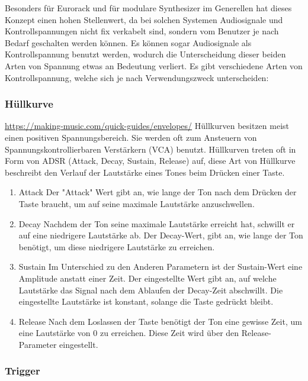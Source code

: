 Besonders für Eurorack und für modulare Synthesizer im Generellen hat dieses Konzept einen hohen Stellenwert, da bei solchen Systemen Audiosignale und Kontrollspannungen nicht fix verkabelt sind, sondern vom Benutzer je nach Bedarf geschalten werden können. Es können sogar Audiosignale als Kontrollspannung benutzt werden, wodurch die Unterscheidung dieser beiden Arten von Spannung etwas an Bedeutung verliert. Es gibt verschiedene Arten von Kontrollspannung, welche sich je nach Verwendungszweck unterscheiden:

\subsubsection{Hüllkurve}
\label{sec:orgd5692b8}
\url{https://making-music.com/quick-guides/envelopes/}
Hüllkurven besitzen meist einen positiven Spannungsbereich. Sie werden oft zum Ansteuern von Spannungskontrollierbaren Verstärkern (VCA) benutzt. Hüllkurven treten oft in Form von ADSR (Attack, Decay, Sustain, Release) auf, diese Art von Hüllkurve beschreibt den Verlauf der Lautstärke eines Tones beim Drücken einer Taste.

\begin{enumerate}
\item Attack
\label{sec:orgac1bf99}
Der "Attack" Wert gibt an, wie lange der Ton nach dem Drücken der Taste braucht, um auf seine maximale Lautstärke anzuschwellen.

\item Decay
\label{sec:orgefac98d}
Nachdem der Ton seine maximale Lautstärke erreicht hat, schwillt er auf eine niedrigere Lautstärke ab. Der Decay-Wert, gibt an, wie lange der Ton benötigt, um diese niedrigere Lautstärke zu erreichen.

\item Sustain
\label{sec:org706f59c}
Im Unterschied zu den Anderen Parametern ist der Sustain-Wert eine Amplitude anstatt einer Zeit. Der eingestellte Wert gibt an, auf welche Lautstärke das Signal nach dem Ablaufen der Decay-Zeit abschwillt. Die eingestellte Lautstärke ist konstant, solange die Taste gedrückt bleibt.

\item Release
\label{sec:org0a77f40}
Nach dem Loslassen der Taste benötigt der Ton eine gewisse Zeit, um eine Lautstärke von 0 zu erreichen. Diese Zeit wird über den Release-Parameter eingestellt.
\end{enumerate}

\subsubsection{Trigger}
\label{sec:org9d34642}
